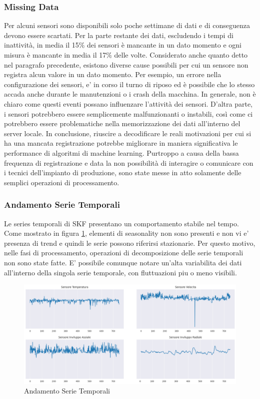 \subsubsection{Missing Data}
Per alcuni sensori sono disponibili solo poche settimane di dati e di conseguenza devono essere scartati. Per la parte restante dei dati, escludendo i tempi di inattività, in media il 15\% dei sensori è mancante in un dato momento e ogni misura è mancante in media il 17\% delle volte. Considerato anche quanto detto nel paragrafo precedente, esistono diverse cause possibili per cui un sensore non registra alcun valore in un dato momento. Per esempio, un errore nella configurazione dei sensori, e' in corso il turno di riposo ed è possibile che lo stesso accada anche durante le manutenzioni o i crash della macchina.
In generale, non è chiaro come questi eventi possano influenzare l'attività dei sensori. D'altra parte, i sensori potrebbero essere semplicemente malfunzionanti o instabili, così come ci potrebbero essere problematiche nella memorizzazione dei dati all'interno del server locale. 
In conclusione, riuscire a decodificare le reali motivazioni per cui si ha una mancata registrazione potrebbe migliorare in maniera significativa le performance di algoritmi di machine learning. Purtroppo a causa della bassa frequenza di registrazione e data la non possibilità di interagire o comunicare con i tecnici dell'impianto di produzione, sono state messe in atto solamente delle semplici operazioni di processamento.

\subsubsection{Andamento Serie Temporali}
Le series temporali di SKF presentano un comportamento stabile nel tempo. Come mostrato in figura \ref{sensors_plot}, elementi di seasonality non sono presenti e non vi e' presenza di trend e quindi le serie possono riferirsi stazionarie.
Per questo motivo, nelle fasi di processamento, operazioni di decomposizione delle serie temporali non sono state fatte.
E' possibile comunque notare un'alta variabilita dei dati all'interno della singola serie temporale, con fluttuazioni piu o meno visibili.
\begin{figure}[t]
\centering
	\includegraphics[width=14cm, scale=1]{images/sensors_plot}
    \caption{Andamento Serie Temporali}
	\label{sensors_plot}
	
\end{figure}

